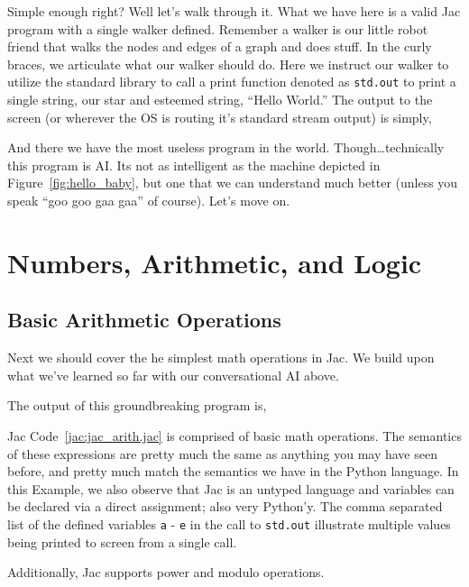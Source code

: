 
Simple enough right? Well let's walk through it. What we have here is a valid Jac program with a single walker defined. Remember a walker is our little robot friend that walks the nodes and edges of a graph and does stuff. In the curly braces, we articulate what our walker should do. Here we instruct our walker to utilize the standard library to call a print function denoted as \texttt{std.out} to print a single string, our star and esteemed string, ``Hello World.'' The output to the screen (or wherever the OS is routing it's standard stream output) is simply,


And there we have the most useless program in the world. Though\dots technically this program is AI. Its not as intelligent as the machine depicted in Figure~\ref{fig:hello_baby}, but one that we can understand much better (unless you speak ``\gls{goo goo gaa gaa}'' of course). Let's move on.

\section{Numbers, Arithmetic, and Logic}

\subsection{Basic Arithmetic Operations}
Next we should cover the he simplest math operations in Jac. We build upon what we've learned so far with our conversational AI above.


The output of this groundbreaking program is,


Jac Code~\ref{jac:jac_arith.jac} is comprised of basic math operations. The semantics of these expressions are pretty much the same as anything you may have seen before, and pretty much match the semantics we have in the Python language. In this Example, we also observe that Jac is an untyped language and variables can be declared via a direct assignment; also very Python'y. The comma separated list of the defined variables \texttt{a} - \texttt{e} in the call to \texttt{std.out} illustrate multiple values being printed to screen from a single call.
\par
Additionally, Jac supports power and modulo operations.

